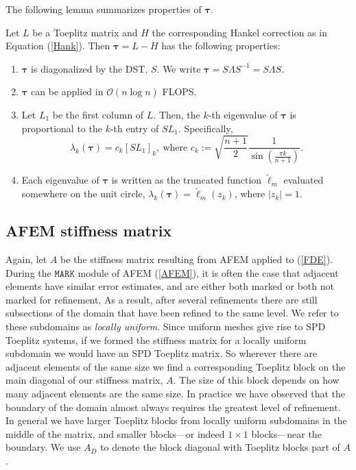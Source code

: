 \documentclass[review]{siamart251216}
\newcommand{\bigOh}{\mathcal{O}}
\newcommand{\A}{{A }}
\newcommand{\Hank}{{ H }}
\newcommand{\Toe}{{ L }}
\newcommand{\toe}{{ \ell }}
\newcommand{\toef}{{ \tilde{\toe}}}
\newcommand{\ptau}{{\bm{\tau}}}
\begin{document}
The following lemma summarizes properties of $\ptau$.
\begin{lemma} \label{lemma:tau}
	Let $\Toe$ be a Toeplitz matrix and $\Hank$ the corresponding Hankel correction as in Equation (\ref{Hank}). Then $\ptau = \Toe - \Hank$ has the following properties: 
\begin{enumerate}
	\item $\ptau$ is diagonalized by the DST, $S$. We write $\ptau = S \Lambda S^{-1} = S \Lambda S$.  
	\item $\ptau$ can be applied in $\bigOh(n \log n)$ FLOPS.
	\item Let $\Toe_1$ be the first column of $\Toe$. Then, the $k$-th eigenvalue of $\ptau$ is proportional to the $k$-th entry of $S\Toe_1$. Specifically, 
	\begin{equation} \label{eigs} \lambda_k(\ptau) = c_k [S\Toe_1]_k, \ \text{where } c_k := \sqrt{\frac{n+1}{2}} \frac{1}{\sin(\frac{\pi k }{n+1})}.\end{equation}
	\item Each eigenvalue of $\ptau$ is written as the truncated function $\toef_m$ evaluated somewhere on the unit circle, $\lambda_k(\ptau) = \toef_m(z_k)$, where $|z_k| = 1$.
\end{enumerate}
\end{lemma}

\subsection{AFEM stiffness matrix} \label{stiffness}
Again, let $\A$ be the stiffness matrix resulting from AFEM applied to (\ref{FDE}). During the $\texttt{MARK}$ module of AFEM (\ref{AFEM}), it is often the case that adjacent elements have similar error estimates, and are either both marked or both not marked for refinement. As a result, after several refinements there are still subsections of the domain that have been refined to the same level. We refer to these subdomains as \emph{locally uniform}.  Since uniform meshes give rise to SPD Toeplitz systems, if we formed the stiffness matrix for a locally uniform subdomain we would have an SPD Toeplitz matrix. So wherever there are adjacent elements of the same size we find a corresponding Toeplitz block on the main diagonal of our stiffness matrix, $\A$. The size of this block depends on how many adjacent elements are the same size. In practice we have observed that the boundary of the domain almost always requires the greatest level of refinement. In general we have larger Toeplitz blocks from locally uniform subdomains in the middle of the matrix, and smaller blocks---or indeed $1 \times 1$ blocks---near the boundary. We use $\A_D$ to denote the block diagonal with Toeplitz blocks part of $\A$. 
\end{document}
